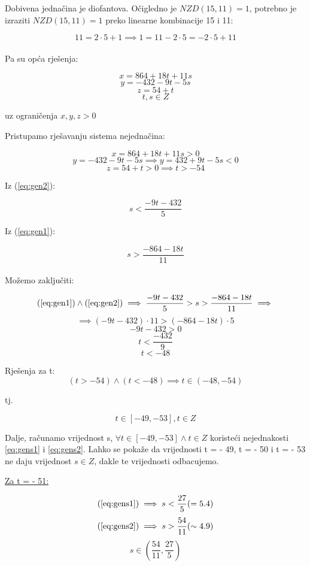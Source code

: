\documentclass[12pt]{article}
\begin{document}
Dobivena jednačina je diofantova. Očigledno je $NZD(15, 11) = 1$, potrebno je izraziti $NZD(15, 11) = 1$ preko linearne kombinacije 15 i 11:

$$11 = 2 \cdot 5 + 1 \implies 1 = 11 - 2 \cdot 5 = - 2 \cdot 5 + 11$$\\

Pa su opća rješenja:

$$x = 864 + 18t + 11s$$
$$y = -432 - 9t - 5s$$
$$z = 54 + t$$
$$t, s\in Z$$
\begin{center}
uz ograničenja $x, y, z > 0$
\end{center}

Pristupamo rješavanju sistema nejednačina:

\[
x = 864 + 18t + 11s > 0 \label{eq:gen1} \tag{1}
\]
\[
y = -432 - 9t - 5s \implies y = 432 + 9t - 5s < 0 \label{eq:gen2} \tag{2}
\]
$$z = 54 + t > 0 \implies t > - 54$$

Iz (\ref{eq:gen2}):

\[
s < \frac{- 9t - 432}{5} \label{eq:gens1} \tag{A}
\]

Iz (\ref{eq:gen1}):

\[
s > \frac{- 864 - 18t}{11} \label{eq:gens2} \tag{B}
\]\\

Možemo zaključiti:

$$(\ref{eq:gen1}) \land (\ref{eq:gen2}) \implies \frac{- 9t - 432}{5} > s > \frac{- 864 - 18t}{11} \implies$$
$$\implies (- 9t - 432) \cdot 11 > (- 864 - 18t) \cdot 5$$
$$- 9t - 432 > 0$$
$$t < \frac{- 432}{9}$$
$$t < -48$$\vspace{1mm}

Rješenja za t: 
$$(t > -54) \land (t < -48) \implies t\in (-48, -54)$$

tj. 

$$t\in [-49, -53], t\in Z$$\vspace{1mm}

Dalje, računamo vrijednost s, $\forall t\in [-49, -53] \land t\in Z$ koristeći nejednakosti \ref{eq:gens1} i \ref{eq:gens2}. Lahko se pokaže da vrijednosti t = - 49, t = - 50 i t = - 53 ne daju vrijednost $s \in Z$, dakle te vrijednosti odbacujemo.\vspace{1mm}

\underline{Za t = - 51:}

$$(\ref{eq:gens1}) \implies s < \frac{27}{5} ( = 5.4)$$
$$(\ref{eq:gens2}) \implies s > \frac{54}{11} ( \sim 4.9)$$
$$s \in (\frac{54}{11}, \frac{27}{5})$$\vspace{1mm}
\end{document}
